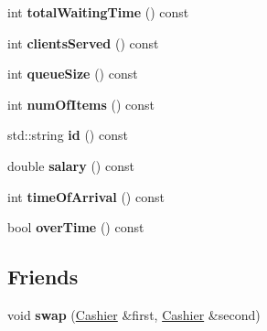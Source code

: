 \begin{DoxyCompactItemize}
\item 
\hypertarget{classCashier_af627f5b03558df68531aa86e4eced5a2}{int {\bfseries total\-Waiting\-Time} () const }\label{classCashier_af627f5b03558df68531aa86e4eced5a2}

\item 
\hypertarget{classCashier_ae6d59b96dd0a97414a883056487f9934}{int {\bfseries clients\-Served} () const }\label{classCashier_ae6d59b96dd0a97414a883056487f9934}

\item 
\hypertarget{classCashier_a6c4e3d00ebeb1e9af88feb6ff2285369}{int {\bfseries queue\-Size} () const }\label{classCashier_a6c4e3d00ebeb1e9af88feb6ff2285369}

\item 
\hypertarget{classCashier_a20019398d52b20997fa109228268b583}{int {\bfseries num\-Of\-Items} () const }\label{classCashier_a20019398d52b20997fa109228268b583}

\item 
\hypertarget{classCashier_a5c32d6426d9e272649151a965564afb1}{std\-::string {\bfseries id} () const }\label{classCashier_a5c32d6426d9e272649151a965564afb1}

\item 
\hypertarget{classCashier_ad394576caf7eb468ce5684181b53c83f}{double {\bfseries salary} () const }\label{classCashier_ad394576caf7eb468ce5684181b53c83f}

\item 
\hypertarget{classCashier_ac0bc4c8f7d5317f296a6ed103a75dfe4}{int {\bfseries time\-Of\-Arrival} () const }\label{classCashier_ac0bc4c8f7d5317f296a6ed103a75dfe4}

\item 
\hypertarget{classCashier_a61d85cd680cc3611c5e9fa6d12544236}{bool {\bfseries over\-Time} () const }\label{classCashier_a61d85cd680cc3611c5e9fa6d12544236}

\end{DoxyCompactItemize}
\subsection*{Friends}
\begin{DoxyCompactItemize}
\item 
\hypertarget{classCashier_a34bcc8f6f2057300c0eba451506915d1}{void {\bfseries swap} (\hyperlink{classCashier}{Cashier} \&first, \hyperlink{classCashier}{Cashier} \&second)}\label{classCashier_a34bcc8f6f2057300c0eba451506915d1}

\end{DoxyCompactItemize}


